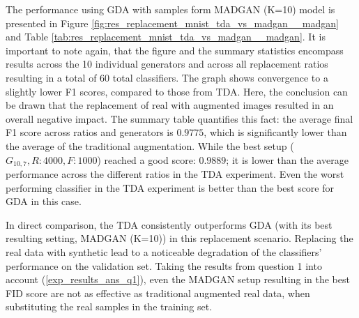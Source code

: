 The performance using GDA with samples form MADGAN (K=10) model is presented in Figure \ref{fig:res_replacement_mnist_tda_vs_madgan__madgan} and Table \ref{tab:res_replacement_mnist_tda_vs_madgan__madgan}. It is important to note again, that the figure and the summary statistics encompass results across the 10 individual generators and across all replacement ratios resulting in a total of $60$ total classifiers. The graph shows convergence to a slightly lower F1 scores, compared to those from TDA. Here, the conclusion can be drawn that the replacement of real with augmented images resulted in an overall negative impact. The summary table quantifies this fact: the average final F1 score across ratios and generators is $0.9775$, which is significantly lower than the average of the traditional augmentation. While the best setup (\(G_{10,7}, R:4000, F:1000\)) reached a good score: $0.9889$; it is lower than the average performance across the different ratios in the TDA experiment. Even the worst performing classifier in the TDA experiment is better than the best score for GDA in this case. 

In direct comparison, the TDA consistently outperforms GDA (with its best resulting setting, MADGAN (K=10)) in this replacement scenario. Replacing the real data with synthetic lead to a noticeable degradation of the classifiers' performance on the validation set. Taking the results from question 1 into account (\ref{exp_results_ans_q1}), even the MADGAN setup resulting in the best FID score are not as effective as traditional augmented real data, when substituting the real samples in the training set. 

